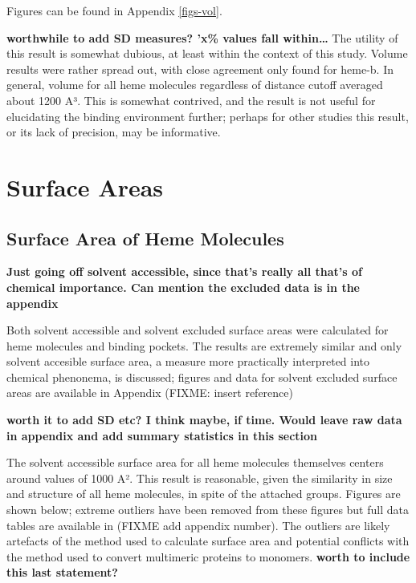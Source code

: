 \documentclass[a4paper, nobind]{templates/ociamthesis}
\begin{document}
Figures can be found in Appendix \ref{figs-vol}.

\textbf{worthwhile to add SD measures? 'x\% values fall within\ldots{}}
The utility of this result is somewhat dubious, at least within the context of this study. Volume results were rather spread out, with close agreement only found for heme-b. In general, volume for all heme molecules regardless of distance cutoff averaged about 1200 A³. This is somewhat contrived, and the result is not useful for elucidating the binding environment further; perhaps for other studies this result, or its lack of precision, may be informative.

\hypertarget{surface-areas}{%
\section{Surface Areas}\label{surface-areas}}

\hypertarget{surface-area-of-heme-molecules}{%
\subsection{Surface Area of Heme Molecules}\label{surface-area-of-heme-molecules}}

\textbf{Just going off solvent accessible, since that's really all that's of chemical importance. Can mention the excluded data is in the appendix}

Both solvent accessible and solvent excluded surface areas were calculated for heme molecules and binding pockets. The results are extremely similar and only solvent accesible surface area, a measure more practically interpreted into chemical phenonema, is discussed; figures and data for solvent excluded surface areas are available in Appendix (FIXME: insert reference)

\textbf{worth it to add SD etc? I think maybe, if time. Would leave raw data in appendix and add summary statistics in this section}

The solvent accessible surface area for all heme molecules themselves centers around values of 1000 A². This result is reasonable, given the similarity in size and structure of all heme molecules, in spite of the attached groups. Figures are shown below; extreme outliers have been removed from these figures but full data tables are available in (FIXME add appendix number). The outliers are likely artefacts of the method used to calculate surface area and potential conflicts with the method used to convert multimeric proteins to monomers. \textbf{worth to include this last statement?}
\end{document}
